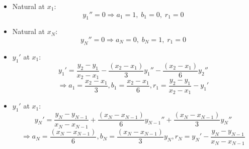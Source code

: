 \documentclass[aps,onecolumn,11pt]{revtex4}
\begin{document}
\begin{itemize}
\item Natural at $x_1$:
\begin{equation}
	y_1'' = 0 \Rightarrow a_1=1,\;b_1=0,\;r_1=0
\end{equation}
\item Natural at $x_N$:
\begin{equation}
	y_N'' = 0 \Rightarrow a_N=0,\;b_N=1,\;r_1=0
\end{equation}

\item $y_1'$ at $x_1$:
\begin{equation}
	y_1' = \dfrac{y_2-y_1}{x_2-x_1} - \dfrac{(x_{2} - x_1)}{3} y_1'' - \dfrac{(x_{2} - x_1)}{6} y_{2}''
\end{equation}
$$
	\Rightarrow a_1=\dfrac{x_2-x_1}{3}, b_1=\dfrac{x_2-x_1}{6}, r_1 = \dfrac{y_2-y_1}{x_2-x_1} - y_1'
$$

\item $y_1'$ at $x_1$:
\begin{equation}
	y_N' = \dfrac{y_{N}-y_{N-1}}{x_{N}-x_{N-1}} + \dfrac{(x_{N} - x_{N-1})}{6} y_{N-1}'' + \dfrac{(x_{N} - x_{N-1})}{3} y_{N}''
\end{equation}
$$
	\Rightarrow a_N= \dfrac{(x_{N} - x_{N-1})}{6} , b_N = \dfrac{(x_{N} - x_{N-1})}{3} y_{N}, r_N = y_N' - \dfrac{y_{N}-y_{N-1}}{x_{N}-x_{N-1}}
$$
\end{itemize}

	
	
\end{document}
